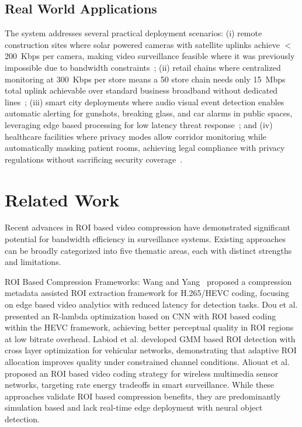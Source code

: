 \documentclass[11pt,a4paper]{article}
\begin{document}
\subsection{Real World Applications}
The system addresses several practical deployment scenarios: (i) remote construction sites where solar powered cameras with satellite uplinks achieve $<$200~Kbps per camera, making video surveillance feasible where it was previously impossible due to bandwidth constraints~\cite{liu2025edge}; (ii) retail chains where centralized monitoring at 300~Kbps per store means a 50 store chain needs only 15~Mbps total uplink achievable over standard business broadband without dedicated lines~\cite{islam2024sdn}; (iii) smart city deployments where audio visual event detection enables automatic alerting for gunshots, breaking glass, and car alarms in public spaces, leveraging edge based processing for low latency threat response~\cite{ahmad2024bandwidth}; and (iv) healthcare facilities where privacy modes allow corridor monitoring while automatically masking patient rooms, achieving legal compliance with privacy regulations without sacrificing security coverage~\cite{kim2024privacy}.

\section{Related Work}
Recent advances in ROI based video compression have demonstrated significant potential for bandwidth efficiency in surveillance systems. Existing approaches can be broadly categorized into five thematic areas, each with distinct strengths and limitations.

ROI Based Compression Frameworks: Wang and Yang~\cite{wang2025compression} proposed a compression metadata assisted ROI extraction framework for H.265/HEVC coding, focusing on edge based video analytics with reduced latency for detection tasks. Dou et al.\cite{li2024region} presented an R-lambda optimization based on CNN with ROI based coding within the HEVC framework, achieving better perceptual quality in ROI regions at low bitrate overhead. Labiod et al.\cite{labiod2023region} developed GMM based ROI detection with cross layer optimization for vehicular networks, demonstrating that adaptive ROI allocation improves quality under constrained channel conditions. Aliouat et al.\cite{aliouat2023region} proposed an ROI based video coding strategy for wireless multimedia sensor networks, targeting rate energy tradeoffs in smart surveillance. While these approaches validate ROI based compression benefits, they are predominantly simulation based and lack real-time edge deployment with neural object detection.
\end{document}
